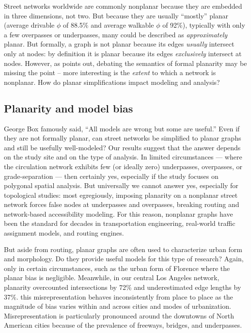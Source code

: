 \documentclass[Afour,sageh,times]{sagej}
\begin{document}
Street networks worldwide are commonly nonplanar because they are embedded in three dimensions, not two. But because they are usually \enquote{mostly} planar (average drivable $\phi$ of 88.5\% and average walkable $\phi$ of 92\%), typically with only a few overpasses or underpasses, many could be described as \emph{approximately} planar. But formally, a graph is not planar because its edges \emph{usually} intersect only at nodes: by definition it is planar because its edges \emph{exclusively} intersect at nodes. However, as \citet{newman_networks:_2010} points out, debating the semantics of formal planarity may be missing the point -- more interesting is the \emph{extent} to which a network is nonplanar. How do planar simplifications impact modeling and analysis?


\subsection{Planarity and model bias}

George Box famously said, \enquote{All models are wrong but some are useful.} Even if they are not formally planar, can street networks be simplified to planar graphs and still be usefully well-modeled? Our results suggest that the answer depends on the study site and on the type of analysis. In limited circumstances --- where the circulation network exhibits few (or ideally zero) underpasses, overpasses, or grade-separation --- then certainly yes, especially if the study focuses on polygonal spatial analysis. But universally we cannot answer yes, especially for topological studies: most egregiously, imposing planarity on a nonplanar street network forces false nodes at underpasses and overpasses, breaking routing and network-based accessibility modeling. For this reason, nonplanar graphs have been the standard for decades in transportation engineering, real-world traffic assignment models, and routing engines.

But aside from routing, planar graphs are often used to characterize urban form and morphology. Do they provide useful models for this type of research? Again, only in certain circumstances, such as the urban form of Florence where the planar bias is negligible. Meanwhile, in our central Los Angeles network, planarity overcounted intersections by 72\% and underestimated edge lengths by 37\%. this misrepresentation behaves inconsistently from place to place as the magnitude of bias varies within and across cities and modes of urbanization. Misrepresentation is particularly pronounced around the downtowns of North American cities because of the prevalence of freeways, bridges, and underpasses.
\end{document}
